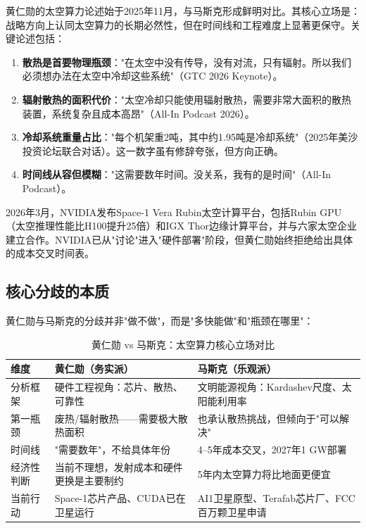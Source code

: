 黄仁勋的太空算力论述始于2025年11月，与马斯克形成鲜明对比。其核心立场是：战略方向上认同太空算力的长期必然性，但在时间线和工程难度上显著更保守。关键论述包括：

\begin{enumerate}[leftmargin=*]
    \item \textbf{散热是首要物理瓶颈}："在太空中没有传导，没有对流，只有辐射。所以我们必须想办法在太空中冷却这些系统"（GTC 2026 Keynote）\cite{huang2026gtc}。
    \item \textbf{辐射散热的面积代价}："太空冷却只能使用辐射散热，需要非常大面积的散热装置，系统复杂且成本高昂"（All-In Podcast 2026）\cite{huang2026allin}。
    \item \textbf{冷却系统重量占比}："每个机架重2吨，其中约1.95吨是冷却系统"（2025年美沙投资论坛联合对话）\cite{musk_huang2025saudi}。这一数字虽有修辞夸张，但方向正确。
    \item \textbf{时间线从容但模糊}："这需要数年时间。没关系，我有的是时间"（All-In Podcast）\cite{huang2026allin}。
\end{enumerate}

2026年3月，NVIDIA发布Space-1 Vera Rubin太空计算平台，包括Rubin GPU（太空推理性能比H100提升25倍）和IGX Thor边缘计算平台，并与六家太空企业建立合作\cite{huang2026gtc}。NVIDIA已从"讨论"进入"硬件部署"阶段，但黄仁勋始终拒绝给出具体的成本交叉时间表。

\subsection{核心分歧的本质}

黄仁勋与马斯克的分歧并非"做不做"，而是"多快能做"和"瓶颈在哪里"：

\begin{table}[H]
\centering
\caption{黄仁勋 vs 马斯克：太空算力核心立场对比}
\label{tab:stance_compare}
\begin{tabular}{p{2.5cm}p{4.5cm}p{4.5cm}}
\toprule
\textbf{维度} & \textbf{黄仁勋（务实派）} & \textbf{马斯克（乐观派）} \\
\midrule
分析框架 & 硬件工程视角：芯片、散热、可靠性 & 文明能源视角：Kardashev尺度、太阳能利用率 \\
\hline
第一瓶颈 & 废热/辐射散热——需要极大散热面积 & 也承认散热挑战，但倾向于"可以解决" \\
\hline
时间线 & "需要数年"，不给具体年份 & 4--5年成本交叉，2027年1 GW部署 \\
\hline
经济性判断 & 当前不理想，发射成本和硬件更换是主要制约 & 5年内太空算力将比地面更便宜 \\
\hline
当前行动 & Space-1芯片产品、CUDA已在卫星运行 & AI1卫星原型、Terafab芯片厂、FCC百万颗卫星申请 \\
\bottomrule
\end{tabular}
\end{table}

